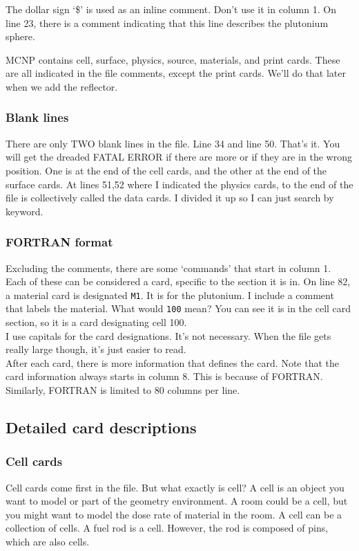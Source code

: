 \documentclass[11pt,a4paper]{article}
\begin{document}
\noindent The dollar sign `\$' is used as an inline comment. Don't use it in column 1. On line 23, there is a comment indicating that this line describes the plutonium sphere. 

\noindent MCNP contains cell, surface, physics, source, materials, and print cards. These are all indicated in the file comments, except the print cards. We'll do that later when we add the reflector. 

\subsubsection{Blank lines}
\noindent There are only TWO blank lines in the file. Line 34 and line 50. That's it. You will get the dreaded FATAL ERROR if there are more or if they are in the wrong position. One is at the end of the cell cards, and the other at the end of the surface cards. At lines 51,52 where I indicated the physics cards, to the end of the file is collectively called the data cards. I divided it up so I can just search by keyword. \\

\subsubsection{FORTRAN format}
\noindent Excluding the comments, there are some `commands' that start in column 1. Each of these can be considered a card, specific to the section it is in. On line 82, a material card is designated \texttt{M1}. It is for the plutonium. I include a comment that labels the material. What would \texttt{100} mean? You can see it is in the cell card section, so it is a card designating cell 100. \\

\noindent I use capitals for the card designations. It's not necessary. When the file gets really large though, it's just easier to read. \\

\noindent After each card, there is more information that defines the card. Note that the card information always starts in column 8. This is because of FORTRAN. Similarly, FORTRAN is limited to 80 columns per line. 

\subsection{Detailed card descriptions}
\subsubsection{Cell cards}
\noindent Cell cards come first in the file. But what exactly is cell? A cell is an object you want to model or part of the geometry environment. A room could be a cell, but you might want to model the dose rate of material in the room. A cell can be a collection of cells. A fuel rod is a cell. However, the rod is composed of pins, which are also cells. \\
\end{document}
